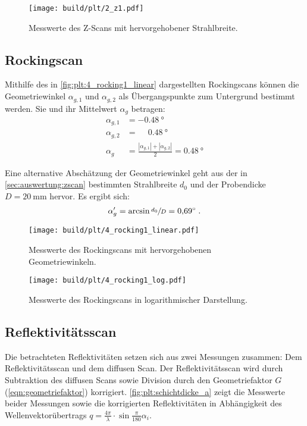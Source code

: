 \begin{figure}
    \centering
    \texttt{[image: build/plt/2\_z1.pdf]}
    \caption{Messwerte des Z-Scans mit hervorgehobener Strahlbreite.}
    \label{fig:plt:2_z1}
\end{figure}


\FloatBarrier
\subsection{Rockingscan}
Mithilfe des in \autoref{fig:plt:4_rocking1_linear}
dargestellten Rockingscans
können die Geometriewinkel $\alpha_{g, 1}$ und $\alpha_{g, 2}$
als Übergangspunkte zum Untergrund bestimmt werden.
Sie und ihr Mittelwert $\alpha_g$ betragen:
\begin{align*}
    \alpha_{g, 1} &= \SI{-0.48}{\degree} \\
    \alpha_{g, 2} &= \phantom{-} \SI{0.48}{\degree} \\
    \alpha_g &= \frac{|\alpha_{g, 1}| + |\alpha_{g, 2}|}{2}
        = \SI{0.48}{\degree}
\end{align*}

Eine alternative Abschätzung der Geometriewinkel
geht aus der in \autoref{sec:auswertung:zscan} bestimmten Strahlbreite $d_0$ und der Probendicke $D = \SI{20}{\milli\meter}$ hervor.
Es ergibt sich:
\[
    \alpha_g' = \arcsin{\sfrac{d_0}{D}}
    = \SI{0.69}{\degree} \; .
\]

\begin{figure}
    \centering
    \texttt{[image: build/plt/4\_rocking1\_linear.pdf]}
    \caption{Messwerte des Rockingscans mit hervorgehobenen Geometriewinkeln.}
    \label{fig:plt:4_rocking1_linear}
\end{figure}

\begin{figure}
    \centering
    \texttt{[image: build/plt/4\_rocking1\_log.pdf]}
    \caption{Messwerte des Rockingscans in logarithmischer Darstellung.}
    \label{fig:plt:4_rocking1_log}
\end{figure}


\FloatBarrier
\subsection{Reflektivitätsscan}
Die betrachteten Reflektivitäten setzen sich aus zwei Messungen zusammen:
Dem Reflektivitätsscan und dem diffusen Scan.
Der Reflektivitätsscan wird durch
    Subtraktion des diffusen Scans sowie
    Division durch den Geometriefaktor $G$ (\autoref{eqn:geometriefaktor})
korrigiert.
\autoref{fig:plt:schichtdicke_a} zeigt die Messwerte beider Messungen sowie die korrigierten Reflektivitäten
in Abhängigkeit des Wellenvektorübertrags $q = \frac{4\pi}{\lambda} · \sin{\frac{\pi}{180} \alpha_i}$.

